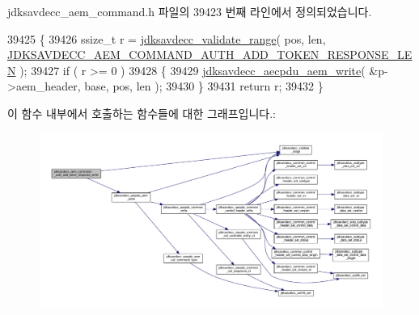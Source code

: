 jdksavdecc\+\_\+aem\+\_\+command.\+h 파일의 39423 번째 라인에서 정의되었습니다.


\begin{DoxyCode}
39425 \{
39426     ssize\_t r = \hyperlink{group__util_ga9c02bdfe76c69163647c3196db7a73a1}{jdksavdecc\_validate\_range}( pos, len, 
      \hyperlink{group__command__auth__add__token__response_ga56c0553f68a8395d3d6ee42519e8bc2c}{JDKSAVDECC\_AEM\_COMMAND\_AUTH\_ADD\_TOKEN\_RESPONSE\_LEN} );
39427     \textcolor{keywordflow}{if} ( r >= 0 )
39428     \{
39429         \hyperlink{group__aecpdu__aem_gad658e55771cce77cecf7aae91e1dcbc5}{jdksavdecc\_aecpdu\_aem\_write}( &p->aem\_header, base, pos, len );
39430     \}
39431     \textcolor{keywordflow}{return} r;
39432 \}
\end{DoxyCode}


이 함수 내부에서 호출하는 함수들에 대한 그래프입니다.\+:
\nopagebreak
\begin{figure}[H]
\begin{center}
\leavevmode
\includegraphics[width=350pt]{group__command__auth__add__token__response_ga63b1c554f72e95db16c232abd7e0dd4e_cgraph}
\end{center}
\end{figure}


